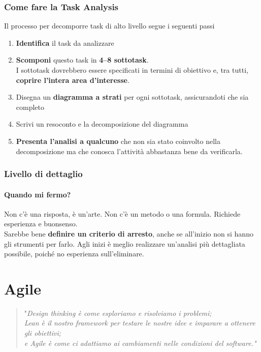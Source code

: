 \documentclass[10pt]{article}
\begin{document}
\subsubsection{Come fare la Task Analysis}
Il processo per decomporre task di alto livello segue i seguenti passi
\begin{enumerate}
\item \textbf{Identifica} il task da analizzare
\item \textbf{Scomponi} questo task in \textbf{4--8 sottotask}.\\
I sottotask dovrebbero essere specificati in termini di obiettivo e, tra tutti, \textbf{coprire l'intera area d'interesse}.
\item Disegna un \textbf{diagramma a strati} per ogni sottotask, assicurandoti che sia completo
\item Scrivi un resoconto e la decomposizione del diagramma
\item \textbf{Presenta l'analisi a qualcuno} che non sia stato coinvolto nella decomposizione ma che conosca l'attività abbastanza bene da verificarla.
\end{enumerate}
\subsubsection{Livello di dettaglio}
\paragraph{Quando mi fermo?} Non c'è una risposta, è un'arte. Non c'è un metodo o una formula. Richiede esperienza e buonsenso.\\
Sarebbe bene \textbf{definire un criterio di arresto}, anche se all'inizio non si hanno gli strumenti per farlo. Agli inizi è meglio realizzare un'analisi più dettagliata possibile, poiché no esperienza sull'eliminare.
\section{Agile}
\begin{quote}
"\textit{Design thinking è come esploriamo e risolviamo i problemi;\\Lean è il nostro framework per testare le nostre idee e imparare a ottenere gli obiettivi;\\
e Agile è come ci adattiamo ai cambiamenti nelle condizioni del software."}
\end{quote}
\end{document}
